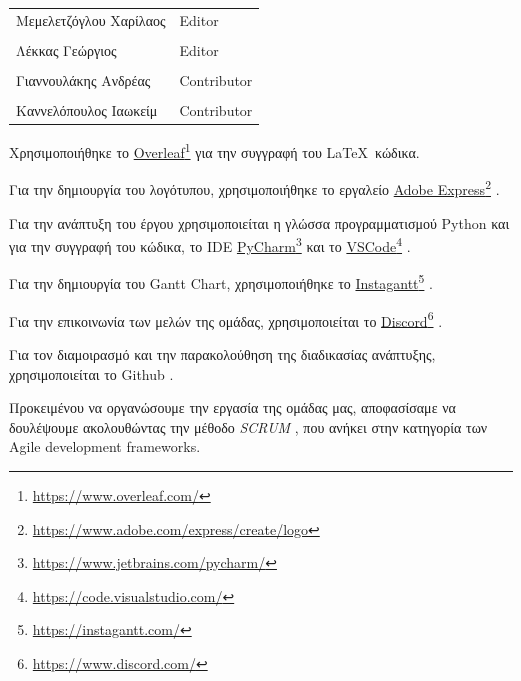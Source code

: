 \documentclass{../ol-softwaremanual}
\newcommand{\doclink}[2]{\href{#1}{#2}\footnote{\url{#1}}}
\begin{document}
	
	\vspace{20pt}
	
	\begin{table}[htbp!]
		\begin{tabular}{ll}
			Μεμελετζόγλου Χαρίλαος & \en Editor \\
			\\ Λέκκας Γεώργιος      &   \en  Editor \\
			\\ Γιαννουλάκης Ανδρέας & \en Contributor \\
			\\ Καννελόπουλος Ιαωκείμ & \en Contributor \\ 
		\end{tabular}
	\end{table}
	
	
	\vspace{20pt}
	
	
	\vspace{20pt}
	\flushleft
	Χρησιμοποιήθηκε το \en \doclink{https://www.overleaf.com/}{Overleaf} \gr για την συγγραφή του \LaTeX\ κώδικα. \break
	
	Για την δημιουργία του λογότυπου, χρησιμοποιήθηκε το εργαλείο \en \doclink{https://www.adobe.com/express/create/logo}{Adobe Express} . \gr \break
	
	Για την ανάπτυξη του έργου χρησιμοποιείται η γλώσσα προγραμματισμού \en Python \gr και για την συγγραφή του κώδικα, το \en IDE \doclink{https://www.jetbrains.com/pycharm/}{PyCharm} \gr και το \en \doclink{https://code.visualstudio.com/}{VSCode} \gr .         \\ \break
	
	Για την δημιουργία του \en Gantt Chart, \gr χρησιμοποιήθηκε το \en \doclink{https://instagantt.com/}{Instagantt} . \gr \break
	
	Για την επικοινωνία των μελών της ομάδας, χρησιμοποιείται το \en \doclink{ https://www.discord.com/}{Discord} \gr . \linebreak 
	
	
	Για τον διαμοιρασμό και την παρακολούθηση της διαδικασίας ανάπτυξης, χρησιμοποιείται το \en Github \gr.
	
	
	
	\newpage
	
	\flushleft
	Προκειμένου να οργανώσουμε την εργασία της ομάδας μας, αποφασίσαμε να δουλέψουμε ακολουθώντας την μέθοδο \en \textit{SCRUM} \gr , που ανήκει στην κατηγορία των \en Agile development frameworks. \gr
	
\end{document}
